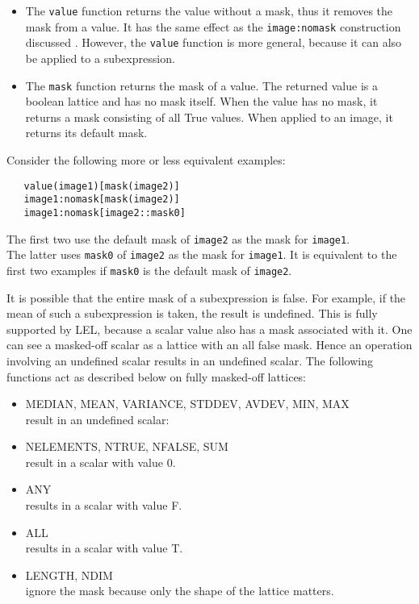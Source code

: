 \begin{itemize}
\item
The \texttt{value} function returns the value without a mask, thus
it removes the mask from a value.
It has the same effect as the \texttt{image:nomask} construction
discussed . However, the \texttt{value}
function is more general, because it can also be applied to a
subexpression.

\item
The \texttt{mask} function returns the mask of a value.
The returned value is a boolean lattice and has no mask itself.
When the value has no mask, it returns a mask consisting of all True values.
When applied to an image, it returns its default mask.
\end{itemize}

Consider the following more or less equivalent examples:
\begin{verbatim}
   value(image1)[mask(image2)]
   image1:nomask[mask(image2)]
   image1:nomask[image2::mask0]
\end{verbatim}
The first two use the default mask of \texttt{image2} as the mask for
\texttt{image1}.
\\The latter uses \texttt{mask0} of \texttt{image2} as the mask for
\texttt{image1}. It is equivalent to the first two examples if
\texttt{mask0} is the default mask of \texttt{image2}.


\medskip\noindent It is possible that the entire mask of a subexpression is false.  For example,
if the mean of such a subexpression is taken, the result is
undefined.  This is fully supported by LEL, because a scalar value also
has a mask associated with it.  One can see a masked-off scalar as a
lattice with an all false mask.  Hence an operation involving an
undefined scalar results in an undefined scalar.  The following
functions act as described below on fully masked-off lattices:

\begin{itemize}
\item MEDIAN, MEAN, VARIANCE, STDDEV, AVDEV, MIN, MAX
\\result in an undefined scalar:
\item NELEMENTS, NTRUE, NFALSE, SUM
\\result in a scalar with value 0.
\item ANY
\\results in a scalar with value F.
\item ALL
\\results in a scalar with value T.
\item LENGTH, NDIM
\\ignore the mask because only the shape of the lattice matters.
\end{itemize}

